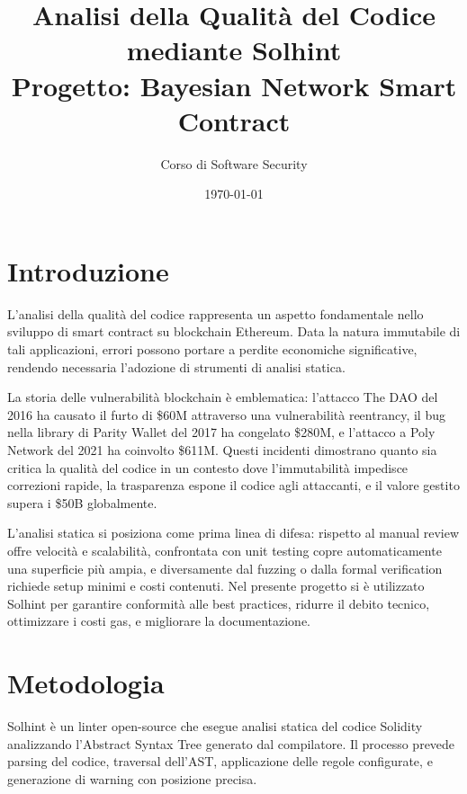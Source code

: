 \documentclass[12pt,a4paper]{article}
\title{\textbf{Analisi della Qualit\`a del Codice mediante Solhint}\\
\large{Progetto: Bayesian Network Smart Contract}}
\author{Corso di Software Security}
\date{\today}
\begin{document}
\maketitle
\thispagestyle{empty}
\newpage
\tableofcontents
\newpage

\section{Introduzione}

L'analisi della qualità del codice rappresenta un aspetto fondamentale nello sviluppo di smart contract su blockchain Ethereum. Data la natura immutabile di tali applicazioni, errori possono portare a perdite economiche significative, rendendo necessaria l'adozione di strumenti di analisi statica.

La storia delle vulnerabilità blockchain è emblematica: l'attacco The DAO del 2016 ha causato il furto di \$60M attraverso una vulnerabilità reentrancy, il bug nella library di Parity Wallet del 2017 ha congelato \$280M, e l'attacco a Poly Network del 2021 ha coinvolto \$611M. Questi incidenti dimostrano quanto sia critica la qualità del codice in un contesto dove l'immutabilità impedisce correzioni rapide, la trasparenza espone il codice agli attaccanti, e il valore gestito supera i \$50B globalmente.

L'analisi statica si posiziona come prima linea di difesa: rispetto al manual review offre velocità e scalabilità, confrontata con unit testing copre automaticamente una superficie più ampia, e diversamente dal fuzzing o dalla formal verification richiede setup minimi e costi contenuti. Nel presente progetto si è utilizzato Solhint per garantire conformità alle best practices, ridurre il debito tecnico, ottimizzare i costi gas, e migliorare la documentazione.

\section{Metodologia}

Solhint è un linter open-source che esegue analisi statica del codice Solidity analizzando l'Abstract Syntax Tree generato dal compilatore. Il processo prevede parsing del codice, traversal dell'AST, applicazione delle regole configurate, e generazione di warning con posizione precisa.
\end{document}
